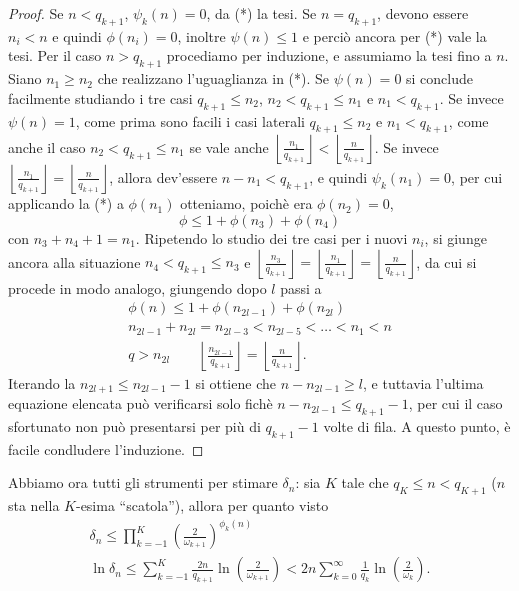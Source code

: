 \begin{proof}
 Se $n<q_{k+1}$, $\psi_k(n)=0$, da (*) la tesi. Se $n=q_{k+1}$, devono essere $n_i<n$ e quindi $\phi(n_i)=0$, inoltre $\psi(n)\leq 1$ e perciò ancora per (*) vale la tesi. \newline
 Per il caso $n>q_{k+1}$ procediamo per induzione, e assumiamo la tesi fino a $n$. Siano $n_1\geq n_2$ che realizzano l'uguaglianza in (*). Se $\psi(n)=0$ si conclude facilmente studiando i tre casi $q_{k+1}\leq n_2$, $n_2<q_{k+1}\leq n_1$ e $n_1<q_{k+1}$. Se invece $\psi(n)=1$, come prima sono facili i casi laterali $q_{k+1}\leq n_2$ e $n_1<q_{k+1}$, come anche il caso $n_2<q_{k+1}\leq n_1$ se vale anche $\left\lfloor\frac{n_1}{q_{k+1}} \right\rfloor<\left\lfloor\frac{n}{q_{k+1}} \right\rfloor$. Se invece $\left\lfloor\frac{n_1}{q_{k+1}} \right\rfloor=\left\lfloor\frac{n}{q_{k+1}} \right\rfloor$, allora dev'essere $n-n_1<q_{k+1}$, e quindi $\psi_k(n_1)=0$, per cui applicando la (*) a $\phi(n_1)$ otteniamo, poichè era $\phi(n_2)=0$,
 \[\phi\leq 1+\phi(n_3)+\phi(n_4)\]
 con $n_3+n_4+1=n_1$. Ripetendo lo studio dei tre casi per i nuovi $n_i$, si giunge ancora alla situazione $n_4<q_{k+1}\leq n_3$ e $\left\lfloor\frac{n_3}{q_{k+1}} \right\rfloor=\left\lfloor\frac{n_1}{q_{k+1}} \right\rfloor=\left\lfloor\frac{n}{q_{k+1}} \right\rfloor$, da cui si procede in modo analogo, giungendo dopo $l$ passi a
 \begin{eqnarray*}
  \phi(n)\leq 1+\phi(n_{2l-1})+\phi(n_{2l})\\
  n_{2l-1}+n_{2l}=n_{2l-3}<n_{2l-5}<\dots<n_1<n\\
  q>n_{2l} \qquad \left\lfloor\frac{n_{2l-1}}{q_{k+1}} \right\rfloor=\left\lfloor\frac{n}{q_{k+1}} \right\rfloor.
 \end{eqnarray*}
Iterando la $n_{2l+1}\leq n_{2l-1}-1$ si ottiene che $n-n_{2l-1}\geq l$, e tuttavia l'ultima equazione elencata può verificarsi solo fichè $n-n_{2l-1}\leq q_{k+1}-1$, per cui il caso sfortunato non può presentarsi per più di $q_{k+1}-1$ volte di fila. A questo punto, è facile condludere l'induzione. 
\end{proof}
 
Abbiamo ora tutti gli strumenti per stimare $\delta_n$: sia $K$ tale che $q_K\leq n<q_{K+1}$ ($n$ sta nella $K$-esima ``scatola''), allora per quanto visto
\begin{eqnarray*}
 \delta_n\leq\prod_{k=-1}^K \left(\frac{2}{\omega_{k+1}}\right)^{\phi_k(n)}\\
 \ln\delta_n\leq \sum_{k=-1}^K \frac{2n}{q_{k+1}}\ln\left(\frac{2}{\omega_{k+1}}\right)<2n\sum_{k=0}^\infty \frac{1}{q_k}\ln\left(\frac{2}{\omega_k}\right).
\end{eqnarray*}

